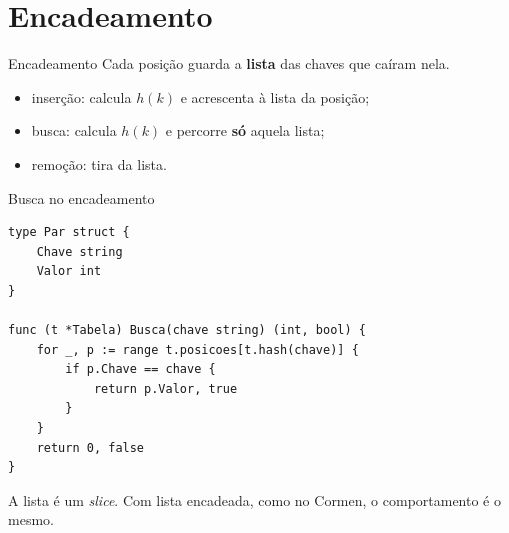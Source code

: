 \documentclass{beamer}
\begin{document}
\section{Encadeamento}

\begin{frame}{Encadeamento}
	Cada posição guarda a \textbf{lista} das chaves que caíram nela.

	\vspace{0.3cm}
	\begin{center}
	\end{center}

	\vspace{0.3cm}
	\begin{itemize}
		\item inserção: calcula $h(k)$ e acrescenta à lista da posição;
		\item busca: calcula $h(k)$ e percorre \textbf{só} aquela lista;
		\item remoção: tira da lista.
	\end{itemize}
\end{frame}

\begin{frame}[fragile]{Busca no encadeamento}
	\begin{verbatim}
type Par struct {
	Chave string
	Valor int
}

func (t *Tabela) Busca(chave string) (int, bool) {
	for _, p := range t.posicoes[t.hash(chave)] {
		if p.Chave == chave {
			return p.Valor, true
		}
	}
	return 0, false
}
\end{verbatim}

	\footnotesize A lista é um \emph{slice}. Com lista encadeada, como no Cormen, o
	comportamento é o mesmo.
\end{frame}
\end{document}
